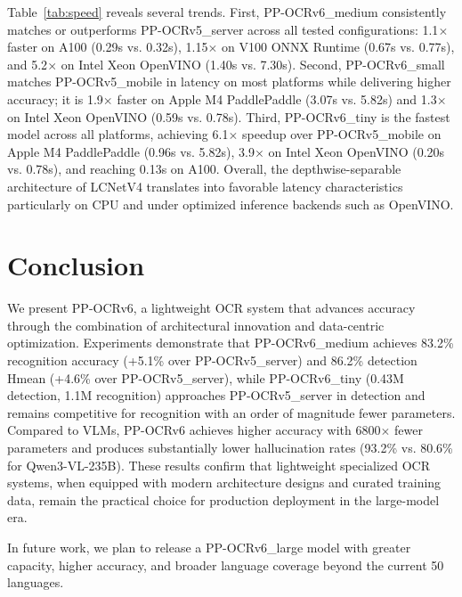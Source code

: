 \documentclass[11pt, a4paper,logo,  copyright, nonumbering]{paddleocr}
\begin{document}
Table~\ref{tab:speed} reveals several trends. First, PP-OCRv6\_medium consistently matches or outperforms PP-OCRv5\_server across all tested configurations: 1.1$\times$ faster on A100 (0.29s vs. 0.32s), 1.15$\times$ on V100 ONNX Runtime (0.67s vs. 0.77s), and 5.2$\times$ on Intel Xeon OpenVINO (1.40s vs. 7.30s). Second, PP-OCRv6\_small matches PP-OCRv5\_mobile in latency on most platforms while delivering higher accuracy; it is 1.9$\times$ faster on Apple M4 PaddlePaddle (3.07s vs. 5.82s) and 1.3$\times$ on Intel Xeon OpenVINO (0.59s vs. 0.78s). Third, PP-OCRv6\_tiny is the fastest model across all platforms, achieving 6.1$\times$ speedup over PP-OCRv5\_mobile on Apple M4 PaddlePaddle (0.96s vs. 5.82s), 3.9$\times$ on Intel Xeon OpenVINO (0.20s vs. 0.78s), and reaching 0.13s on A100. Overall, the depthwise-separable architecture of LCNetV4 translates into favorable latency characteristics particularly on CPU and under optimized inference backends such as OpenVINO.




\section{Conclusion}
\label{sec:conclusion}

We present PP-OCRv6, a lightweight OCR system that advances accuracy through the combination of architectural innovation and data-centric optimization. Experiments demonstrate that PP-OCRv6\_medium achieves 83.2\% recognition accuracy (+5.1\% over PP-OCRv5\_server) and 86.2\% detection Hmean (+4.6\% over PP-OCRv5\_server), while PP-OCRv6\_tiny (0.43M detection, 1.1M recognition) approaches PP-OCRv5\_server in detection and remains competitive for recognition with an order of magnitude fewer parameters. Compared to VLMs, PP-OCRv6 achieves higher accuracy with 6800$\times$ fewer parameters and produces substantially lower hallucination rates (93.2\% vs. 80.6\% for Qwen3-VL-235B). These results confirm that lightweight specialized OCR systems, when equipped with modern architecture designs and curated training data, remain the practical choice for production deployment in the large-model era.

In future work, we plan to release a PP-OCRv6\_large model with greater capacity, higher accuracy, and broader language coverage beyond the current 50 languages.



{
    \small
    
}
\end{document}
